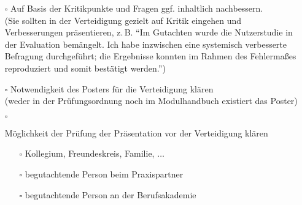 \begin{itemize}
{\begin{itemize}
{                \begin{itemize}
                    \item[$\square$] Gutachten Praxispartner
                    \item[$\square$] Gutachten Berufsakademie
                \end{itemize}
            }
            \item[$\square$]{
                Auf Basis der Kritikpunkte und Fragen ggf. inhaltlich nachbessern.\\
                (Sie sollten in der Verteidigung gezielt auf Kritik eingehen und Verbesserungen präsentieren, z.\,B. \enquote{Im Gutachten wurde die Nutzerstudie in der Evaluation bemängelt. Ich habe inzwischen eine systemisch verbesserte Befragung durchgeführt; die Ergebnisse konnten im Rahmen des Fehlermaßes reproduziert und somit bestätigt werden.})
            }         
            \item[$\square$]{
                Notwendigkeit des Posters für die Verteidigung klären\\
                (weder in der Prüfungsordnung noch im Modulhandbuch existiert das Poster)
            }
            \item[$\square$]{
                Möglichkeit der Prüfung der Präsentation vor der Verteidigung klären
                \begin{itemize}
                    \item[$\square$] Kollegium, Freundeskreis, Familie, $\ldots$
                    \item[$\square$] begutachtende Person beim Praxispartner
                    \item[$\square$] begutachtende Person an der Berufsakademie
                \end{itemize}
            }
        \end{itemize}
    }
\end{itemize}